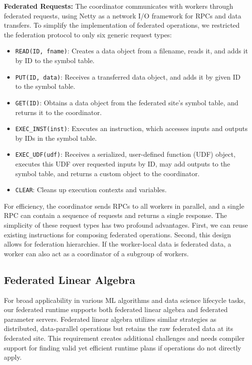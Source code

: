 \documentclass[sigconf,screen]{acmart}
\newenvironment{itemize2}{\begin{itemize}\setlength{\itemsep}{2.5pt}\setlength{\parskip}{0pt}\setlength{\parsep}{0pt}}{\end{itemize}}
\begin{document}
\textbf{Federated Requests:} The coordinator communicates with workers through federated requests, using Netty as a network I/O framework for RPCs and data transfers. To simplify the implementation of federated operations, we restricted the federation protocol to only six generic request types:
\begin{itemize2}
\item \texttt{READ(ID, fname)}: Creates a data object from a filename, reads it, and adds it by ID to the symbol table.
\item \texttt{PUT(ID, data)}: Receives a transferred data object, and adds it by given ID to the symbol table. 
\item \texttt{GET(ID)}: Obtains a data object from the federated site's symbol table, and returns it to the coordinator.
\item \texttt{EXEC\_INST(inst)}: Executes an instruction, which accesses inputs and outputs by IDs in the symbol table.
\item \texttt{EXEC\_UDF(udf)}: Receives a serialized, user-defined function (UDF) object, executes this UDF over requested inputs by ID, may add outputs to 
the symbol table, and returns a custom object to the coordinator.
\item \texttt{CLEAR}: Cleans up execution contexts and variables.
\end{itemize2}
For efficiency, the coordinator sends RPCs to all workers in parallel, and a single RPC can contain a sequence of requests and returns a single response. The simplicity of these request types has two profound advantages. First, we can reuse existing instructions for composing federated operations. Second, this design allows for federation hierarchies. If the worker-local data is federated data, a worker can also act as a coordinator of a subgroup of workers.

\subsection{Federated Linear Algebra}

For broad applicability in various ML algorithms and data science lifecycle tasks, our federated runtime supports both federated linear algebra and federated parameter servers. Federated linear algebra utilizes similar strategies as distributed, data-parallel operations but retains the raw federated data at its federated site. This requirement creates additional challenges and needs compiler support for finding valid yet efficient runtime plans if operations do not directly apply.
\end{document}
